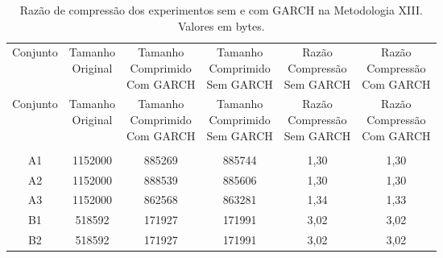 \begin{center}
\begin{longtable}{cccccc}
\toprule
\rowcolor{white}
\caption[Metodologia XIII: Razão de compressão]{Razão de compressão dos
experimentos sem e com GARCH na Metodologia XIII.
Valores em bytes.} \label{Tab:razaocompressaoMet} \\
\midrule
Conjunto & \specialcell{Tamanho \\Original} & \specialcell{Tamanho
\\Comprimido\\Com GARCH} & \specialcell{Tamanho
\\Comprimido\\Sem GARCH} & \specialcell{Razão \\Compressão
\\Sem GARCH} & \specialcell{Razão \\Compressão
\\Com GARCH} \\
\midrule
\endfirsthead
\midrule
\rowcolor{white}
Conjunto & \specialcell{Tamanho \\Original} & \specialcell{Tamanho
\\Comprimido\\Com GARCH} & \specialcell{Tamanho
\\Comprimido\\Sem GARCH} & \specialcell{Razão \\Compressão
\\Sem GARCH} & \specialcell{Razão \\Compressão
\\Com GARCH} \\
\toprule
\endhead
\midrule \\ %
\endfoot
\bottomrule
\endlastfoot
    A1    & 1152000 & 885269 & 885744 & 1,30  & 1,30 \\
    A2    & 1152000 & 888539 & 885606 & 1,30  & 1,30 \\
    A3    & 1152000 & 862568 & 863281 & 1,34  & 1,33 \\
    B1    & 518592 & 171927 & 171991 & 3,02  & 3,02 \\
    B2    & 518592 & 171927 & 171991 & 3,02  & 3,02 \\

\end{longtable}
\end{center}
